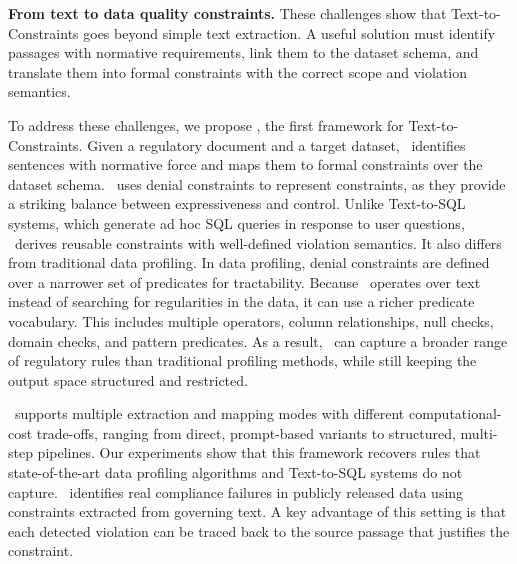 \smallskip
\noindent\textbf{From text to data quality constraints.}
These challenges show that Text-to-Constraints goes beyond simple text extraction. A useful solution must identify passages with normative requirements, link them to the dataset schema, and translate them into formal constraints with the correct scope and violation semantics.

To address these challenges, we propose \system, the first framework for Text-to-Constraints. Given a regulatory document and a target dataset, \system\ identifies sentences with normative force and maps them to formal constraints over the dataset schema. \system\ uses denial constraints to represent constraints, as they provide a striking balance between expressiveness and control. Unlike Text-to-SQL systems, which generate ad hoc SQL queries in response to user questions, \system\ derives reusable constraints with well-defined violation semantics. It also differs from traditional data profiling. In data profiling, denial constraints are defined over a narrower set of predicates for tractability. Because \system\ operates over text instead of searching for regularities in the data, it can use a richer predicate vocabulary. This includes multiple operators, column relationships, null checks, domain checks, and pattern predicates. As a result, \system\ can capture a broader range of regulatory rules than traditional profiling methods, while still keeping the output space structured and restricted.

\system\ supports multiple extraction and mapping modes with different computational-cost trade-offs, ranging from direct, prompt-based variants to structured, multi-step pipelines. Our experiments show that this framework recovers rules that state-of-the-art data profiling algorithms and Text-to-SQL systems do not capture. \system\ identifies real compliance failures in publicly released data using constraints extracted from governing text. A key advantage of this setting is that each detected violation can be traced back to the source passage that justifies the constraint.


